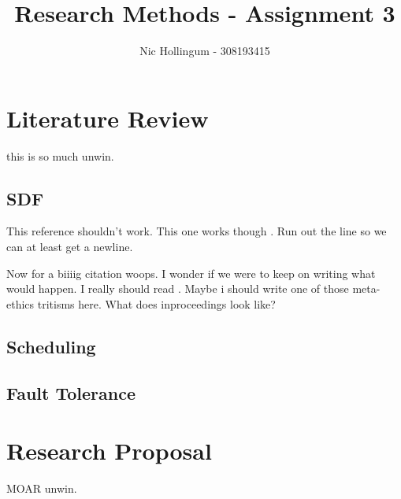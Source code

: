 
\author{Nic Hollingum - 308193415}
\title{Research Methods - Assignment 3}



\maketitle


\section{Literature Review}

this is so much unwin.

\subsection{SDF}

This reference \cite{rofl} shouldn't work.
This one works though \cite{sdfBook}.
Run out the line so we can at least get a newline.

Now for a biiiig citation \cite{ran75} woops.
I wonder if we were to keep on writing what would happen.
I really should read \cite{sih91}.
Maybe i should write one of those meta-ethics tritisms here.
What does inproceedings \cite{son10} look like?

\subsection{Scheduling}


\subsection{Fault Tolerance}


\section{Research Proposal}

MOAR unwin.





